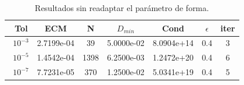 \documentclass[11pt,a4paper]{article}
\begin{document}
\begin{table}[H]
\caption{Resultados sin readaptar el parámetro de forma.}
\begin{center}
\begin{tabular}{|c|c|c|c|c|c|c|}
\hline
\ Tol & ECM & N & $D_{min}$ & Cond & $\epsilon$ & iter \\
\hline
\ $10^{-3}$ & 2.7199e-04& 39 & 5.0000e-02 &8.0904e+14 &0.4& 3  \\
\ $10^{-5}$ & 1.4542e-04& 1398 & 6.2500e-03 & 1.2472e+20 & 0.4 &6\\
\ $10^{-7}$ & 7.7231e-05 & 370 & 1.2500e-02& 5.0341e+19& 0.4 & 5\\
\hline
\end{tabular}
\end{center}
\end{table}
\end{document}
